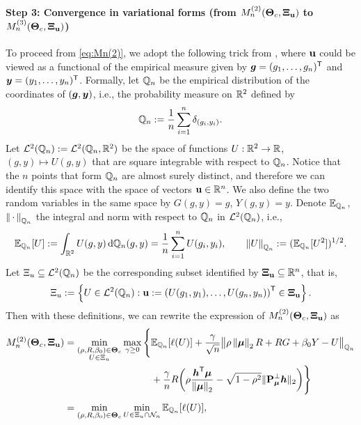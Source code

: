 \paragraph{Step 3: Convergence in variational forms (from $M_n^{(2)}(\text{\boldmath $\Theta$}_{c}, \text{\boldmath $\Xi$}_{\mathrm{\bf u}})$ to $M_n^{(3)}(\text{\boldmath $\Theta$}_{c}, \text{\boldmath $\Xi$}_{\mathrm{\bf u}})$)}
To proceed from \cref{eq:Mn(2)}, we adopt the following trick from \cite{montanari2023generalizationerrormaxmarginlinear}, where $\mathrm{\bf u}$ could be viewed as a functional of the empirical measure given by ${\boldsymbol{g}} = (g_1, \ldots, g_n)^{\sf T}$ and $\text{\boldmath $y$} = (y_1, \ldots, y_n)^{\sf T}$. Formally, let $\mathbb{Q}_n$ be the empirical distribution of the coordinates of $({\boldsymbol{g}}, \text{\boldmath $y$})$, i.e., the probability measure on $\mathbb{R}^2$ defined by
\begin{equation*}
    \mathbb{Q}_n := \frac{1}{n}\sum_{i=1}^n \delta_{(g_i, y_i)}.
\end{equation*}
Let $\mathcal{L}^2(\mathbb{Q}_n) := \mathcal{L}^2(\mathbb{Q}_n, \mathbb{R}^2)$ be the space of functions $U: \mathbb{R}^2 \to \mathbb{R}$, $(g, y) \mapsto U(g, y)$ that are square integrable with respect to $\mathbb{Q}_n$. Notice that the $n$ points that form $\mathbb{Q}_n$ are almost surely distinct, and therefore we can identify this space with the space of vectors $\mathrm{\bf u} \in \mathbb{R}^n$. We also define the two random variables in the same space by $G(g, y) = g$, $Y(g, y) = y$. Denote $\mathbb{E}_{\mathbb{Q}_n}$, $\left\|{\,\cdot\,}\right\|_{\mathbb{Q}_n}$ the integral and norm with respect to $\mathbb{Q}_n$ in $\mathcal{L}^2(\mathbb{Q}_n)$, i.e.,
\begin{equation*}
    \mathbb{E}_{\mathbb{Q}_n}[U] := \int_{\mathbb{R}^2} U(g,y) \, \textup{d} \mathbb{Q}_n(g, y)
    = \frac{1}{n} \sum_{i=1}^n U(g_i, y_i)
    ,
    \qquad
    \left\|{U}\right\|_{\mathbb{Q}_n} := (\mathbb{E}_{\mathbb{Q}_n}[U^2])^{1/2}.
\end{equation*}
Let $\Xi_{u} \subseteq \mathcal{L}^2(\mathbb{Q}_n)$ be the corresponding subset identified by $\text{\boldmath $\Xi$}_{\mathrm{\bf u}} \subseteq \mathbb{R}^n$, that is,
\begin{equation*}
    \Xi_{u} := \left\{ U \in \mathcal{L}^2(\mathbb{Q}_n) : \mathrm{\bf u} := \left( U(g_1, y_1), \ldots, U(g_n, y_n) \right)^{\sf T} \in \text{\boldmath $\Xi$}_{\mathrm{\bf u}}  \right\}. 
\end{equation*}
Then with these definitions, we can rewrite the expression of $M_n^{(2)}(\text{\boldmath $\Theta$}_{c}, \text{\boldmath $\Xi$}_{\mathrm{\bf u}})$ as
\begin{align*}
        M_n^{(2)}(\bTheta_{c}, \bXi_{\bu}) 
        & = \min_{ \substack{ (\rho, R, \beta_0) \in \bTheta_{c} \\  U \in \Xi_{u} } } 
        \max_{\gamma \ge 0}
        \, \Biggl\{ 
                \E_{\Q_n}[\ell(U)]
        + \frac{\gamma}{\sqrt{n}} \bigl\| \rho\norm{\vmu}_2 R + R G + \beta_0 Y - U \bigr\|_{\Q_n}
            \\
        & \phantom{.} \phantom{ 
            = \min_{ \substack{ (\rho, R, \beta_0) \in \bTheta_{c} \\ U \in \Xi_{u} } } 
        \max_{\gamma \ge 0}
        \, \Biggl\{ 
        }
        + \frac{\gamma}{n} R\biggl( \rho\frac{\hh^\top \vmu}{\norm{\vmu}_2} - \sqrt{1 - \rho^2} \| \bP_{\bmu}^\perp \hh \|_2 \biggr)  
            \Biggr\}
        \\
        &   
        = \min_{ (\rho, R, \beta_0) \in \bTheta_{c} }
        \min_{ U \in \Xi_{u}  \cap   \mathcal{N}_n }
        \E_{\Q_n}[\ell(U)],
\end{align*}
